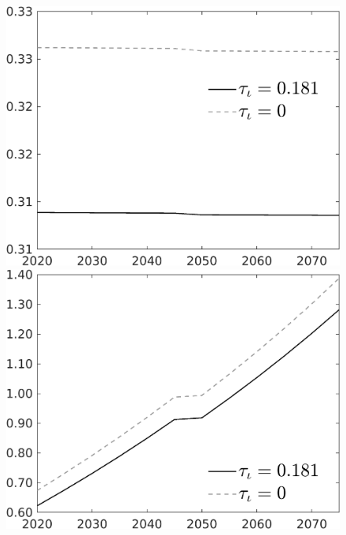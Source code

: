 \documentclass[12pt]{article}
\begin{document}
\begin{figure}[h!!]
\begin{minipage}[]{0.32\textwidth}
\end{minipage}	
\begin{minipage}[]{0.32\textwidth}
\includegraphics[width=1\textwidth]{../../codding_model/own_basedOnFried/optimalPol_010922_revision/figures/all_13Sept22/CompTauf_bytaul_Reg0_hl_spillover0_nsk0_xgr0_knspil0_sep1_LFlimit1_emsbase0_countec0_GovRev0_etaa0.79_lgd1.png}
\end{minipage}	
\begin{minipage}[]{0.32\textwidth}
\includegraphics[width=1\textwidth]{../../codding_model/own_basedOnFried/optimalPol_010922_revision/figures/all_13Sept22/CompTauf_bytaul_Reg0_C_spillover0_nsk0_xgr0_knspil0_sep1_LFlimit1_emsbase0_countec0_GovRev0_etaa0.79_lgd1.png}

\end{minipage}
\end{figure}
\end{document}
